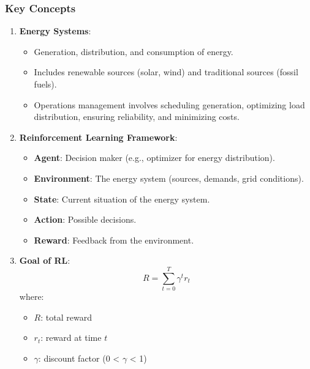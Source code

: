 \documentclass[aspectratio=169]{beamer}
\begin{document}
\begin{frame}[fragile]
  \frametitle{Key Concepts}
  \begin{enumerate}
    \item \textbf{Energy Systems}:
      \begin{itemize}
        \item Generation, distribution, and consumption of energy.
        \item Includes renewable sources (solar, wind) and traditional sources (fossil fuels).
        \item Operations management involves scheduling generation, optimizing load distribution, ensuring reliability, and minimizing costs.
      \end{itemize}

    \item \textbf{Reinforcement Learning Framework}:
      \begin{itemize}
        \item \textbf{Agent}: Decision maker (e.g., optimizer for energy distribution).
        \item \textbf{Environment}: The energy system (sources, demands, grid conditions).
        \item \textbf{State}: Current situation of the energy system.
        \item \textbf{Action}: Possible decisions.
        \item \textbf{Reward}: Feedback from the environment.
      \end{itemize}
    
    \item \textbf{Goal of RL}:
      \begin{equation}
      R = \sum_{t=0}^{T} \gamma^t r_t
      \end{equation}
      where:
      \begin{itemize}
        \item $R$: total reward
        \item $r_t$: reward at time $t$
        \item $\gamma$: discount factor (0 < $\gamma$ < 1)
      \end{itemize}
  \end{enumerate}
\end{frame}
\end{document}
